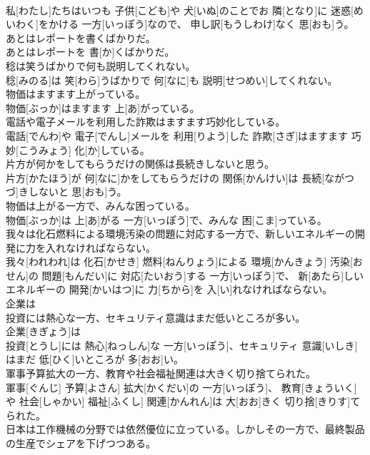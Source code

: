 \documentclass[8pt]{extreport}
\begin{document}
\begin{CJK}{UTF8}{min}
\\	私[わたし]たちはいつも 子供[こども]や 犬[いぬ]のことでお 隣[となり]に 迷惑[めいわく]をかける 一方[いっぽう]なので、 申し訳[もうしわけ]なく 思[おも]う。
\\	あとはレポートを書くばかりだ。	
\\	あとはレポートを 書[か]くばかりだ。
\\	稔は笑うばかりで何も説明してくれない。	
\\	稔[みのる]は 笑[わら]うばかりで 何[なに]も 説明[せつめい]してくれない。
\\	物価はますます上がっている。	
\\	物価[ぶっか]はますます 上[あ]がっている。
\\	電話や電子メールを利用した詐欺はますます巧妙化している。	
\\	電話[でんわ]や 電子[でんし]メールを 利用[りよう]した 詐欺[さぎ]はますます 巧妙[こうみょう] 化[か]している。
\\	片方が何かをしてもらうだけの関係は長続きしないと思う。	
\\	片方[かたほう]が 何[なに]かをしてもらうだけの 関係[かんけい]は 長続[ながつづ]きしないと 思[おも]う。
\\	物価は上がる一方で、みんな困っている。	
\\	物価[ぶっか]は 上[あ]がる 一方[いっぽう]で、みんな 困[こま]っている。
\\	我々は化石燃料による環境汚染の問題に対応する一方で、新しいエネルギーの開発に力を入れなければならない。	
\\	我々[われわれ]は 化石[かせき] 燃料[ねんりょう]による 環境[かんきょう] 汚染[おせん]の 問題[もんだい]に 対応[たいおう]する 一方[いっぽう]で、 新[あたら]しいエネルギーの 開発[かいはつ]に 力[ちから]を 入[い]れなければならない。
\\	企業は
\\	投資には熱心な一方、セキュリティ意識はまだ低いところが多い。	
\\	企業[きぎょう]は 
\\	投資[とうし]には 熱心[ねっしん]な 一方[いっぽう]、セキュリティ 意識[いしき]はまだ 低[ひく]いところが 多[おお]い。
\\	軍事予算拡大の一方、教育や社会福祉関連は大きく切り捨てられた。	
\\	軍事[ぐんじ] 予算[よさん] 拡大[かくだい]の 一方[いっぽう]、 教育[きょういく]や 社会[しゃかい] 福祉[ふくし] 関連[かんれん]は 大[おお]きく 切り捨[きりす]てられた。
\\	日本は工作機械の分野では依然優位に立っている。しかしその一方で、最終製品の生産でシェアを下げつつある。	

\end{CJK}
\end{document}
